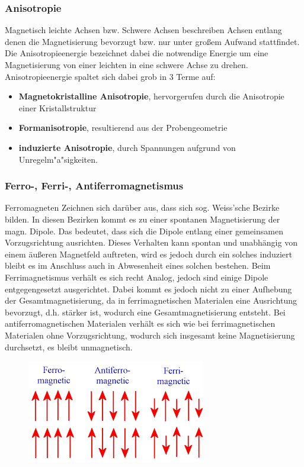         \subsubsection*{Anisotropie}
            Magnetisch leichte Achsen bzw. Schwere Achsen beschreiben Achsen entlang denen die Magnetisierung bevorzugt
            bzw. nur unter großem Aufwand stattfindet. Die Anisotropieenergie bezeichnet dabei die notwendige Energie
            um eine Magnetisierung von einer leichten in eine schwere Achse zu drehen.\\
            Anisotropieenergie spaltet sich dabei grob in 3 Terme auf:
            \begin{itemize}
                \item \textbf{Magnetokristalline Anisotropie}, hervorgerufen durch die Anisotropie einer Kristallstruktur
                \item \textbf{Formanisotropie}, resultierend aus der Probengeometrie
                \item \textbf{induzierte Anisotropie}, durch Spannungen aufgrund von Unregelm"a"sigkeiten.
            \end{itemize}
        \subsubsection*{Ferro-, Ferri-, Antiferromagnetismus}
            Ferromagneten Zeichnen sich darüber aus, dass sich sog. Weiss'sche Bezirke bilden. In diesen Bezirken
            kommt es zu einer spontanen Magnetisierung der magn. Dipole. Das bedeutet, dass sich die Dipole entlang einer
            gemeinsamen Vorzugsrichtung ausrichten. Dieses Verhalten kann spontan und unabhängig von einem äußeren Magnetfeld
            auftreten, wird es jedoch durch ein solches induziert bleibt es im Anschluss auch in Abwesenheit eines solchen bestehen.
            Beim Ferrimagnetismus verhält es sich recht Analog, jedoch sind einige Dipole entgegengesetzt ausgerichtet.
            Dabei kommt es jedoch nicht zu einer Aufhebung der Gesamtmagnetisierung, da in ferrimagnetischen Materialen
            eine Ausrichtung bevorzugt, d.h. stärker ist, wodurch eine Gesamtmagnetisierung entsteht.
            Bei antiferromagnetischen Materialen verhält es sich wie bei ferrimagnetischen Materialen ohne Vorzugsrichtung,
            wodurch sich insgesamt keine Magnetisierung durchsetzt, es bleibt unmagnetisch.
            \begin{figure}[H]
                \centering
                \includegraphics{Images/ferroferrianti.png}
            \end{figure}
